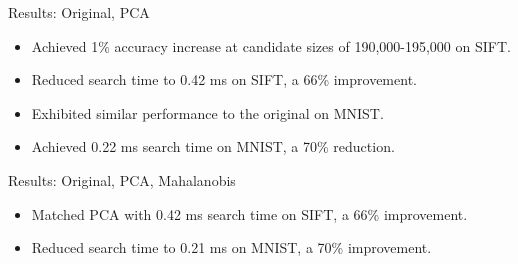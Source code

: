 \documentclass[10pt, aspectratio=169]{beamer}
\begin{document}
\begin{frame}{Results: \textcolor{MyOriginal}{Original}, \textcolor{MyPca}{PCA}}
 
\begin{figure}[h]
    \centering    
    \begin{subfigure}[b]{0.45\textwidth}
        \centering
    \end{subfigure}
    \hspace{2mm}
    \begin{subfigure}[b]{0.45\textwidth}
        \centering
    \end{subfigure}
\end{figure}

    \begin{itemize}
        \item Achieved 1\% accuracy increase at candidate sizes of 190,000-195,000 on SIFT.
    	\item Reduced search time to 0.42 ms on SIFT, a 66\% improvement.
    	\item Exhibited similar performance to the original on MNIST.
    	\item Achieved 0.22 ms search time on MNIST, a 70\% reduction.
    \end{itemize}
    
\end{frame}

\begin{frame}{Results: \textcolor{MyOriginal}{Original}, \textcolor{MyPca}{PCA}, \textcolor{MyMahalanobis}{Mahalanobis}}
\begin{figure}[h]
    \centering    
    \begin{subfigure}[b]{0.45\textwidth}
        \centering
    \end{subfigure}
    \hspace{2mm}
    \begin{subfigure}[b]{0.45\textwidth}
        \centering
    \end{subfigure}
\end{figure}

    \begin{itemize}
    	\item Matched PCA with 0.42 ms search time on SIFT, a 66\% improvement.
    	\item Reduced search time to 0.21 ms on MNIST, a 70\% improvement.
    \end{itemize}

\end{frame}
\end{document}
